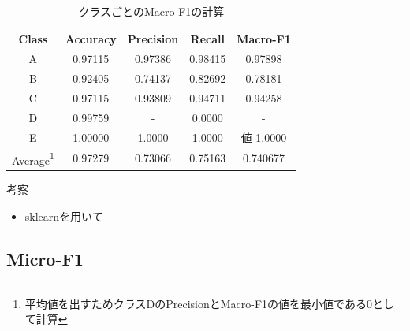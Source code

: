 \documentclass[leno,xcolor=dvipsnames]{beamer}
\begin{document}
  \begin{frame}
    \begin{table}[H]
      \centering
      \caption{クラスごとのMacro-F1の計算} \label{tb:macro-F1}
      \begin{tabular}{ccccc}
        \toprule
        Class & Accuracy & Precision & Recall & Macro-F1 \\
        \midrule
        A & 0.97115 & 0.97386 & 0.98415 & 0.97898 \\
        B & 0.92405 & 0.74137 & 0.82692 & 0.78181 \\
        C & 0.97115 & 0.93809 & 0.94711 & 0.94258 \\
        D & 0.99759 & - & 0.0000 & - \\
        E & 1.00000 & 1.0000 & 1.0000 &値 1.0000 \\
        \midrule
        Average\footnote{平均値を出すためクラスDのPrecisionとMacro-F1の値を最小値である0として計算} & 0.97279 & 0.73066 & 0.75163 & 0.740677 \\        
        \bottomrule
      \end{tabular}
    \end{table}
  \end{frame}

  \begin{frame}{考察}
    \begin{itemize}
      \item sklearnを用いて
    \end{itemize}
  \end{frame}

  \begin{frame}
    \section{Micro-F1}
  \end{frame}
\end{document}
